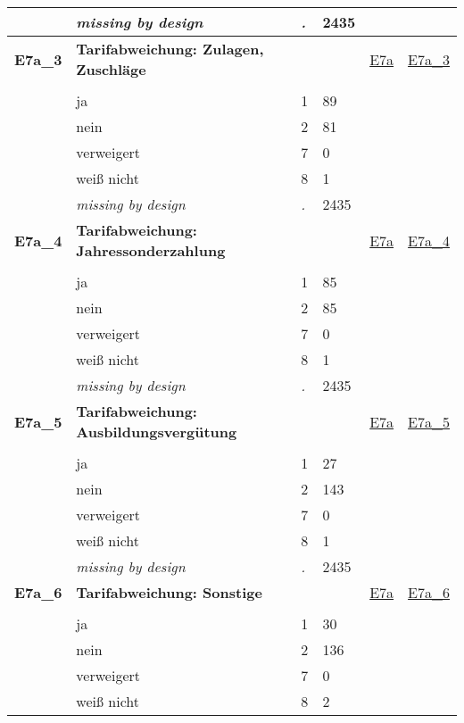 \begin{longtable}{| L{2.45cm} | L{6cm} | C{1.5cm} | R{1cm} | C{2.25cm} | C{2.25cm} |}
   & \textit{missing by design} & \textit{.} & 2435 &  &  \\ 
   \midrule
\textbf{E7a\_3}\label{var:E7a:3} & \textbf{Tarifabweichung: Zulagen, Zuschläge} &  &  & \hyperref[E7a]{E7a} & \hyperref[var:suf:E7a:3]{E7a\_3} \\ 
   &  &  &  &  &  \\ 
   & ja & 1 & 89 &  &  \\ 
   & nein & 2 & 81 &  &  \\ 
   & verweigert & 7 & 0 &  &  \\ 
   & weiß nicht & 8 & 1 &  &  \\ 
   & \textit{missing by design} & \textit{.} & 2435 &  &  \\ 
   \midrule
\textbf{E7a\_4}\label{var:E7a:4} & \textbf{Tarifabweichung: Jahressonderzahlung} &  &  & \hyperref[E7a]{E7a} & \hyperref[var:suf:E7a:4]{E7a\_4} \\ 
   &  &  &  &  &  \\ 
   & ja & 1 & 85 &  &  \\ 
   & nein & 2 & 85 &  &  \\ 
   & verweigert & 7 & 0 &  &  \\ 
   & weiß nicht & 8 & 1 &  &  \\ 
   & \textit{missing by design} & \textit{.} & 2435 &  &  \\ 
   \midrule
\textbf{E7a\_5}\label{var:E7a:5} & \textbf{Tarifabweichung: Ausbildungsvergütung} &  &  & \hyperref[E7a]{E7a} & \hyperref[var:suf:E7a:5]{E7a\_5} \\ 
   &  &  &  &  &  \\ 
   & ja & 1 & 27 &  &  \\ 
   & nein & 2 & 143 &  &  \\ 
   & verweigert & 7 & 0 &  &  \\ 
   & weiß nicht & 8 & 1 &  &  \\ 
   & \textit{missing by design} & \textit{.} & 2435 &  &  \\ 
   \midrule
\textbf{E7a\_6}\label{var:E7a:6} & \textbf{Tarifabweichung: Sonstige} &  &  & \hyperref[E7a]{E7a} & \hyperref[var:suf:E7a:6]{E7a\_6} \\ 
   &  &  &  &  &  \\ 
   & ja & 1 & 30 &  &  \\ 
   & nein & 2 & 136 &  &  \\ 
   & verweigert & 7 & 0 &  &  \\ 
   & weiß nicht & 8 & 2 &  &  \\ 

\end{longtable}
